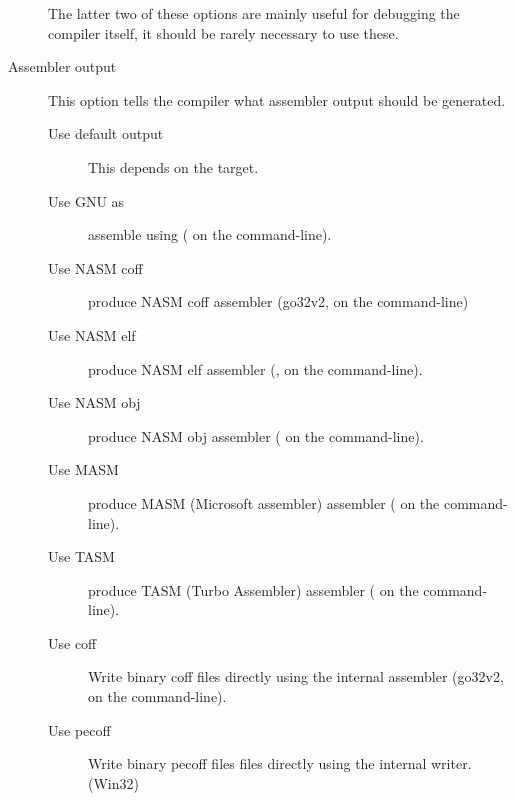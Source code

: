 \begin{description}
The latter two of these options are mainly useful for debugging the
compiler itself, it should be rarely necessary to use these.
\item[Assembler output] This option tells the compiler what assembler output
should be generated.
\begin{description}
\item[Use default output] This depends on the target.
\item[Use GNU as] assemble using \gnu {} ( on the
command-line).
\item[Use NASM coff] produce NASM coff assembler (go32v2,  on the
command-line)
\item[Use NASM elf] produce NASM elf assembler (\linux,  on
the command-line).
\item[Use NASM obj] produce NASM obj assembler ( on the
command-line).
\item[Use MASM] produce MASM (Microsoft assembler) assembler ( on the
command-line).
\item[Use TASM] produce TASM (Turbo Assembler) assembler ( on the
command-line).
\item[Use coff] Write binary coff files directly using the internal
assembler (go32v2,  on the command-line).
\item[Use pecoff] Write binary pecoff files files directly using the
internal writer. (Win32)
\end{description}
\end{description}
%
%
